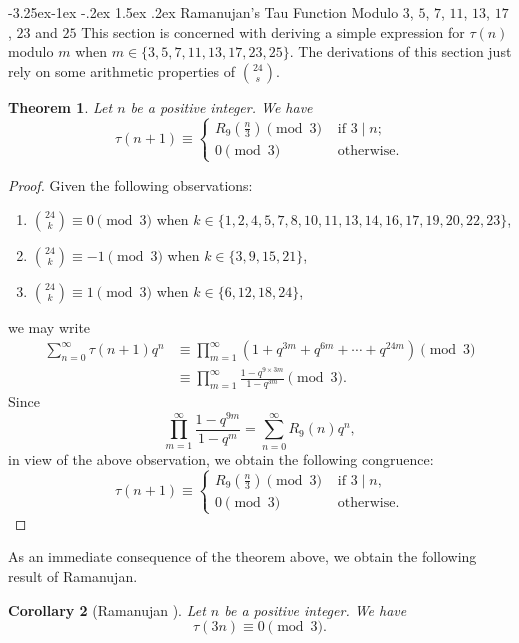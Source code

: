 \documentclass[10pt]{article}
\makeatletter
\renewcommand\subsection{\@startsection{subsection}{2}{\z@}
{-3.25ex\@plus -1ex \@minus -.2ex}
{1.5ex \@plus .2ex}
{\normalfont\normalsize\bfseries\boldmath}}
\newtheorem{theorem}{Theorem}[section]
\newtheorem{corollary}[theorem]{Corollary}
\theoremstyle{definition}
\makeatother
\begin{document}
\subsection{ Ramanujan's Tau Function Modulo $3$, $5$, $7$, $11$, $13$, $17$, $23$ and $25$}
This section is concerned with deriving a simple expression for $\tau(n)$ modulo $m$ when $m\in\{3,5,7,11,13,17,23,25\}$. The derivations of this section just rely on some arithmetic properties of ${24\choose{s}}$.
\begin{theorem}\label{taumodulo3}
Let $n$ be a positive integer. We have
\begin{equation}
\tau(n+1)\equiv\begin{cases}
R_9\left(\frac{n}{3}\right)\pmod 3&\text{ if $3\mid n$};\\ 
0\pmod 3&\text{ otherwise}.
\end{cases}
\end{equation}
\end{theorem}
\begin{proof}
Given the following observations:
\begin{enumerate}
\item
${24\choose{k}}\equiv0\pmod{3}$ 
when $k\in\{1,2,4,5,7,8,10,11,13,14,16,17,19,20,22,23\}$,
\item ${24\choose{k}}\equiv-1\pmod{3}$
when $k\in\{3,9,15,21\}$,
\item ${24\choose{k}}\equiv1\pmod{3}$ when $k\in\{6,12,18,24\}$,
\end{enumerate}
we may write
\begin{align*}
\sum_{n=0}^{\infty}\tau(n+1)q^n
&\equiv\prod_{m=1}^{\infty}(1+q^{3m}+q^{6m}+\cdots +q^{24m})\pmod{3}\\
&\equiv\prod_{m=1}^{\infty}\frac{1-q^{9\times 3m}}{1-q^{3m}}\pmod{3}.
\end{align*}
Since 
\[\prod_{m=1}^{\infty}\frac{1-q^{9m}}{1-q^m}=\sum_{n=0}^{\infty}R_9(n)q^n,
\]
in view of the above observation, we obtain the following congruence:
\begin{equation*}
\tau(n+1)\equiv\begin{cases}
R_9\left(\frac{n}{3}\right)\pmod 3&\text{ if $3\mid n$},\\ 
0\pmod 3&\text{ otherwise}.
\end{cases}
\end{equation*}
\end{proof}
As an immediate consequence of the theorem above, we obtain the following result of Ramanujan.
\begin{corollary}[Ramanujan \cite{ramanujan-20}]
Let $n$ be a positive integer. We have
\begin{equation*}
\tau(3n)\equiv 0\pmod{3}.
\end{equation*}
\end{corollary}
\end{document}
